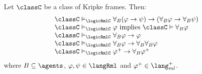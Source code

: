 \begin{proposition}\label{rml-validities}
Let $\classC$ be a class of Kripke frames. Then:
$$
\begin{array}{l}
    \classC \entails_\logicRmlC \allrefsBs (\phi \implies \psi) \implies (\allrefsBs \phi \implies \allrefsBs \psi)\\
    \classC \entails_\logicRmlC \phi \text{ implies } \classC \entails \allrefsBs \phi\\
    \classC \entails_\logicRmlC \allrefsBs \phi \implies \phi\\
    \classC \entails_\logicRmlC \allrefsBs \phi \implies \allrefsBs \allrefsBs \phi\\
    \classC \entails_\logicRmlC \phi^+ \implies \allrefsBs \phi^+
\end{array}
$$
where $\agentsB \subseteq \agents$, $\phi, \psi \in \langRml$ and $\phi^+ \in \langMlPlus$.
\end{proposition}


